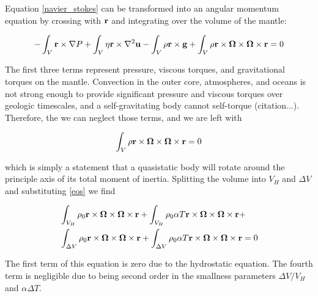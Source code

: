 \documentclass[extra,mreferee]{gji}
\begin{document}
Equation \ref{navier_stokes} can be transformed into an angular momentum equation by crossing with $\bf r$ and integrating over the volume of the mantle:

\begin{equation}
\begin{aligned}
-\int_V {\bf r} \times \nabla P + \int_V \eta {\bf r} \times \nabla^2 {\bf u} - \int_V \rho {\bf r \times g} + \int_V \rho {\bf r \times \mitbf{\Omega} \times \mitbf{\Omega} \times {\bf r }} &= 0 \\
\end{aligned}
\end{equation}


The first three terms represent pressure, viscous torques, and gravitational torques on the mantle.  
Convection in the outer core, atmospheres, and oceans is not strong enough to provide significant pressure and viscous torques over geologic timescales, and a self-gravitating body cannot self-torque (citation...).
Therefore, the we can neglect those terms, and we are left with

\begin{equation}
\begin{aligned}
\int_V \rho {\bf r \times \mitbf{\Omega} \times \mitbf{\Omega} \times {\bf r }} &= 0 \\
\end{aligned}
\end{equation}

which is simply a statement that a quasistatic body will rotate around the principle axis of its total moment of inertia.
Splitting the volume into $V_H$ and $\Delta V$ and substituting \ref{eos} we find

\begin{equation}
\begin{aligned}
&\int_{V_H} \rho_0 {\bf r \times \mitbf{\Omega} \times \mitbf{\Omega} \times {\bf r }} + 
\int_{V_H} \rho_0 \alpha T {\bf r \times \mitbf{\Omega} \times \mitbf{\Omega} \times {\bf r }} +  \\
&\int_{\Delta V} \rho_0 {\bf r \times \mitbf{\Omega} \times \mitbf{\Omega} \times {\bf r }} + 
\int_{\Delta V} \rho_0 \alpha T {\bf r \times \mitbf{\Omega} \times \mitbf{\Omega} \times {\bf r }} = 0  \\
\end{aligned}
\end{equation}

The first term of this equation is zero due to the hydrostatic equation.  
The fourth term is negligible due to being second order in the smallness parameters $\Delta V/V_H$ and $\alpha \Delta T$.
\end{document}
